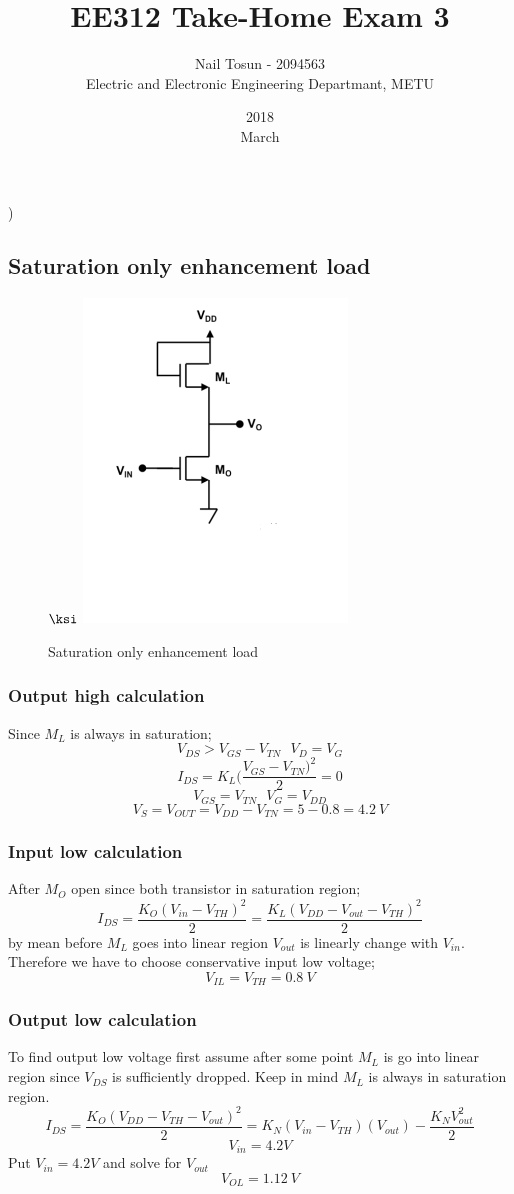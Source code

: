 \documentclass[11 pt]{article}
\title{EE312 Take-Home Exam 3}
\date{2018\\ March}
\author{Nail Tosun - 2094563 \\ Electric and Electronic Engineering Departmant, METU}
\begin{document}
)
\subsection*{Saturation only enhancement load}
\begin{figure}[H]
\centering

$\ksi$
  \includegraphics[scale=0.7]{saturationonly}
  \caption{Saturation only enhancement load}
  \label{fig:zero}
\end{figure}
\subsubsection*{Output high calculation}
Since $M_L$ is always in saturation;
\[V_{DS}>V_{GS}-V_{TN} \>\>\> V_D=V_G\]
\[I_{DS}=K_L(\frac{ V_{GS}-V_{TN})^2}{2}=0\]
\[V_{GS}=V_{TN} \>\>\> V_G=V_{DD}\]
\[V_S=V_{OUT}=V_{DD}-V_{TN}=5-0.8=4.2 \> V\]
\subsubsection*{Input low calculation}
After $M_O$ open since both transistor in saturation region;
\[I_{DS}=\frac{K_O(V_{in}-V_{TH})^2}{2} =\frac{K_L(V_{DD}-V_{out}-V_{TH})^2}{2}\]
by mean before $M_L$ goes into linear region $V_{out}$ is linearly change with $V_{in}$. Therefore we have to choose conservative input low voltage;
\[V_{IL}=V_{TH}=0.8 \>V\]

\subsubsection*{Output low calculation}
To find output low voltage first assume after some point $M_L$ is go into linear region since $V_{DS}$ is sufficiently dropped. Keep in mind $M_L$ is always in saturation region.
\[I_{DS}=\frac{K_O(V_{DD}-V_{TH}-V_{out})^2}{2}=K_N(V_{in}-V_{TH})(V_{out})-\frac{K_N V_{out}^2}{2}\]
\[V_{in}=4.2 V\]
Put $V_{in}=4.2V$ and solve for $V_{out}$
\[V_{OL}=1.12\> V\]
\end{document}
